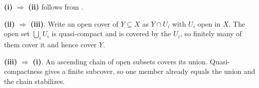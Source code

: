 \textbf{(i)} $\Rightarrow$ \textbf{(ii)} follows from .

\textbf{(ii)} $\Rightarrow$ \textbf{(iii)}. Write an open cover of $Y\subseteq X$ as $Y\cap U_i$ with $U_i$ open in $X$. The open set $\bigcup_iU_i$ is quasi-compact and is covered by the $U_i$, so finitely many of them cover it and hence cover $Y$.

\textbf{(iii)} $\Rightarrow$ \textbf{(i)}. An ascending chain of open subsets covers its union. Quasi-compactness gives a finite subcover, so one member already equals the union and the chain stabilizes.
